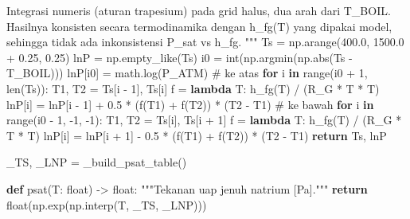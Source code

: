 \documentclass[
  indonesian,
  12pt,
  a4paper,
]{report}
\newenvironment{Shaded}{\begin{snugshade}}{\end{snugshade}}
\newcommand{\BuiltInTok}[1]{\textcolor[rgb]{0.00,0.23,0.31}{#1}}
\newcommand{\CommentTok}[1]{\textcolor[rgb]{0.37,0.37,0.37}{#1}}
\newcommand{\ControlFlowTok}[1]{\textcolor[rgb]{0.00,0.23,0.31}{\textbf{#1}}}
\newcommand{\DecValTok}[1]{\textcolor[rgb]{0.68,0.00,0.00}{#1}}
\newcommand{\FloatTok}[1]{\textcolor[rgb]{0.68,0.00,0.00}{#1}}
\newcommand{\KeywordTok}[1]{\textcolor[rgb]{0.00,0.23,0.31}{\textbf{#1}}}
\newcommand{\NormalTok}[1]{\textcolor[rgb]{0.00,0.23,0.31}{#1}}
\newcommand{\OperatorTok}[1]{\textcolor[rgb]{0.37,0.37,0.37}{#1}}
\begin{document}
\begin{Shaded}
\begin{Highlighting}[]
\CommentTok{    Integrasi numeris (aturan trapesium) pada grid halus, dua arah dari}
\CommentTok{    T\_BOIL. Hasilnya konsisten secara termodinamika dengan h\_fg(T) yang}
\CommentTok{    dipakai model, sehingga tidak ada inkonsistensi P\_sat vs h\_fg.}
\CommentTok{    """}
\NormalTok{    Ts }\OperatorTok{=}\NormalTok{ np.arange(}\FloatTok{400.0}\NormalTok{, }\FloatTok{1500.0} \OperatorTok{+} \FloatTok{0.25}\NormalTok{, }\FloatTok{0.25}\NormalTok{)}
\NormalTok{    lnP }\OperatorTok{=}\NormalTok{ np.empty\_like(Ts)}
\NormalTok{    i0 }\OperatorTok{=} \BuiltInTok{int}\NormalTok{(np.argmin(np.}\BuiltInTok{abs}\NormalTok{(Ts }\OperatorTok{{-}}\NormalTok{ T\_BOIL)))}
\NormalTok{    lnP[i0] }\OperatorTok{=}\NormalTok{ math.log(P\_ATM)}
    \CommentTok{\# ke atas}
    \ControlFlowTok{for}\NormalTok{ i }\KeywordTok{in} \BuiltInTok{range}\NormalTok{(i0 }\OperatorTok{+} \DecValTok{1}\NormalTok{, }\BuiltInTok{len}\NormalTok{(Ts)):}
\NormalTok{        T1, T2 }\OperatorTok{=}\NormalTok{ Ts[i }\OperatorTok{{-}} \DecValTok{1}\NormalTok{], Ts[i]}
\NormalTok{        f }\OperatorTok{=} \KeywordTok{lambda}\NormalTok{ T: h\_fg(T) }\OperatorTok{/}\NormalTok{ (R\_G }\OperatorTok{*}\NormalTok{ T }\OperatorTok{*}\NormalTok{ T)}
\NormalTok{        lnP[i] }\OperatorTok{=}\NormalTok{ lnP[i }\OperatorTok{{-}} \DecValTok{1}\NormalTok{] }\OperatorTok{+} \FloatTok{0.5} \OperatorTok{*}\NormalTok{ (f(T1) }\OperatorTok{+}\NormalTok{ f(T2)) }\OperatorTok{*}\NormalTok{ (T2 }\OperatorTok{{-}}\NormalTok{ T1)}
    \CommentTok{\# ke bawah}
    \ControlFlowTok{for}\NormalTok{ i }\KeywordTok{in} \BuiltInTok{range}\NormalTok{(i0 }\OperatorTok{{-}} \DecValTok{1}\NormalTok{, }\OperatorTok{{-}}\DecValTok{1}\NormalTok{, }\OperatorTok{{-}}\DecValTok{1}\NormalTok{):}
\NormalTok{        T1, T2 }\OperatorTok{=}\NormalTok{ Ts[i], Ts[i }\OperatorTok{+} \DecValTok{1}\NormalTok{]}
\NormalTok{        f }\OperatorTok{=} \KeywordTok{lambda}\NormalTok{ T: h\_fg(T) }\OperatorTok{/}\NormalTok{ (R\_G }\OperatorTok{*}\NormalTok{ T }\OperatorTok{*}\NormalTok{ T)}
\NormalTok{        lnP[i] }\OperatorTok{=}\NormalTok{ lnP[i }\OperatorTok{+} \DecValTok{1}\NormalTok{] }\OperatorTok{{-}} \FloatTok{0.5} \OperatorTok{*}\NormalTok{ (f(T1) }\OperatorTok{+}\NormalTok{ f(T2)) }\OperatorTok{*}\NormalTok{ (T2 }\OperatorTok{{-}}\NormalTok{ T1)}
    \ControlFlowTok{return}\NormalTok{ Ts, lnP}


\NormalTok{\_TS, \_LNP }\OperatorTok{=}\NormalTok{ \_build\_psat\_table()}


\KeywordTok{def}\NormalTok{ psat(T: }\BuiltInTok{float}\NormalTok{) }\OperatorTok{{-}\textgreater{}} \BuiltInTok{float}\NormalTok{:}
    \CommentTok{"""Tekanan uap jenuh natrium [Pa]."""}
    \ControlFlowTok{return} \BuiltInTok{float}\NormalTok{(np.exp(np.interp(T, \_TS, \_LNP)))}



\end{Highlighting}
\end{Shaded}
\end{document}
